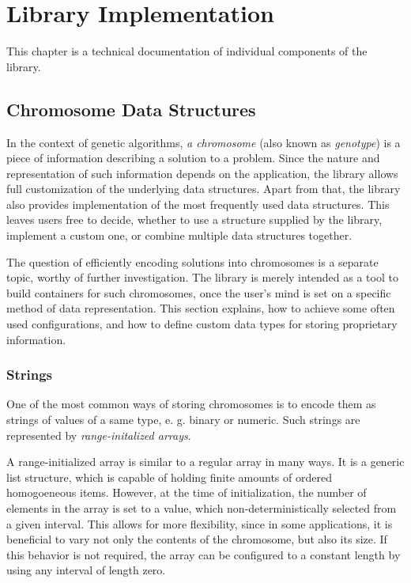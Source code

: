 \chapter{Library Implementation}
This chapter is a technical documentation of individual components of the library.

\section{Chromosome Data Structures}
In the context of genetic algorithms, \textit{a chromosome} (also known as \textit{genotype}) is a piece of information describing a solution to a problem. Since the nature and representation of such information depends on the application, the library allows full customization of the underlying data structures. Apart from that, the library also provides implementation of the most frequently used data structures. This leaves users free to decide, whether to use a structure supplied by the library, implement a custom one, or combine multiple data structures together.

The question of efficiently encoding solutions into chromosomes is a separate topic, worthy of further investigation. The library is merely intended as a tool to build containers for such chromosomes, once the user's mind is set on a specific method of data representation. This section explains, how to achieve some often used configurations, and how to define custom data types for storing proprietary information.

\subsection{Strings}
One of the most common ways of storing chromosomes is to encode them as strings of values of a same type, e. g. binary or numeric. Such strings are represented by \textit{range-initalized arrays}.

A range-initialized array is similar to a regular array in many ways. It is a generic list structure, which is capable of holding finite amounts of ordered homogoeneous items. However, at the time of initialization, the number of elements in the array is set to a value, which non-deterministically selected from a given interval. This allows for more flexibility, since in some applications, it is beneficial to vary not only the contents of the chromosome, but also its size. If this behavior is not required, the array can be configured to a constant length by using any interval of length zero.

